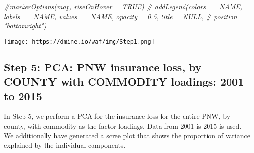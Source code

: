 \documentclass[]{article}
\newenvironment{Shaded}{\begin{snugshade}}{\end{snugshade}}
\newcommand{\CommentTok}[1]{\textcolor[rgb]{0.56,0.35,0.01}{\textit{#1}}}
\newcommand{\DataTypeTok}[1]{\textcolor[rgb]{0.13,0.29,0.53}{#1}}
\newcommand{\KeywordTok}[1]{\textcolor[rgb]{0.13,0.29,0.53}{\textbf{#1}}}
\newcommand{\NormalTok}[1]{#1}
\newcommand{\StringTok}[1]{\textcolor[rgb]{0.31,0.60,0.02}{#1}}
\begin{document}
\begin{Shaded}
\begin{Highlighting}[]
{{{{{{\KeywordTok{addScaleBar}\NormalTok{(mapz, }\DataTypeTok{position =} \KeywordTok{c}\NormalTok{(}\StringTok{"topright"}\NormalTok{), }\DataTypeTok{options =} \KeywordTok{scaleBarOptions}\NormalTok{())}
\end{Highlighting}
\end{Shaded}

\hypertarget{htmlwidget-9b63410989326dee42b0}{}

\begin{Shaded}
\begin{Highlighting}[]
\CommentTok{#markerOptions(map, riseOnHover = TRUE)}
 \CommentTok{# addLegend(colors = ~NAME, labels = ~NAME, values = ~NAME, opacity = 0.5, title = NULL,}
  \CommentTok{#          position = "bottomright")}
\end{Highlighting}
\end{Shaded}

\texttt{[image: https://dmine.io/waf/img/Step1.png]}

\hypertarget{step-5-pca-pnw-insurance-loss-by-county-with-commodity-loadings-2001-to-2015}{%
\subsection{Step 5: PCA: PNW insurance loss, by COUNTY with COMMODITY
loadings: 2001 to
2015}\label{step-5-pca-pnw-insurance-loss-by-county-with-commodity-loadings-2001-to-2015}}

In Step 5, we perform a PCA for the insurance loss for the entire PNW,
by county, with commodity as the factor loadings. Data from 2001 is 2015
is used. We additionally have generated a scree plot that shows the
proportion of variance explained by the individual components.
\end{document}
